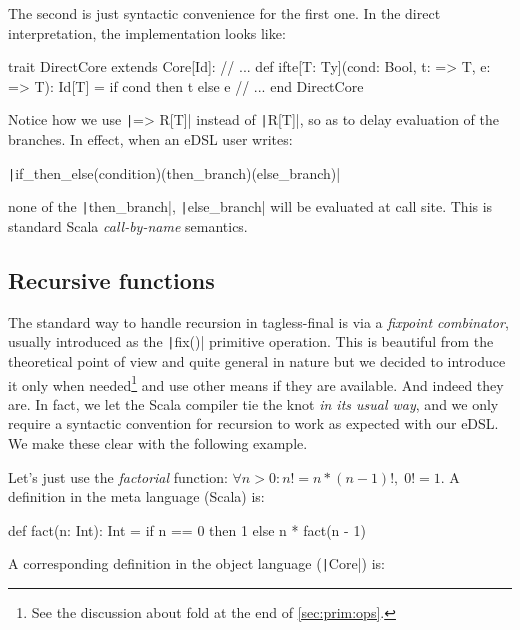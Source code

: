 \documentclass[11pt]{article}
\newcommand{\ScalaI}[1]{\texttt|#1|}
\begin{document}
\noindent The second is just syntactic convenience for the first one. In the 
direct interpretation, the implementation looks like:

\begin{ScalaBlockSimple}
trait DirectCore extends Core[Id]:
  // ...
  def ifte[T: Ty](cond: Bool, t: => T, e: => T): Id[T] =
    if cond then t else e
  // ...
end DirectCore
\end{ScalaBlockSimple}

Notice how we use \ScalaI{=> R[T]} instead of \ScalaI{R[T]}, so as to delay 
evaluation of the branches. In effect, when an eDSL user writes:

\ScalaI{if_then_else(condition)(then_branch)(else_branch)}

\noindent none of the \ScalaI{then_branch}, \ScalaI{else_branch} will be 
evaluated at call site. This is standard Scala \textit{call-by-name} 
semantics.


\subsection{Recursive functions}
\label{sec:rec:fun}
The standard way to handle recursion in tagless-final is via a 
\textit{fixpoint combinator}, usually introduced as the \ScalaI{fix()} 
primitive operation. This is beautiful from the theoretical point of view and 
quite general in nature but we decided to introduce it only when 
needed\footnote{See the discussion about fold at the end of 
\autoref{sec:prim:ops}.} and use other means if they are available. And 
indeed they are. In fact, we let the Scala compiler tie the knot \textit{in 
its usual way}, and we only require a syntactic convention for recursion to 
work as expected with our eDSL. We make these clear with the following 
example.

Let's just use the \textit{factorial} function: $\forall n > 0: n! = n * (n - 
1)!, \; 0! = 1$. A definition in the meta language (Scala) is:

\begin{ScalaBlockSimple}
def fact(n: Int): Int =
  if n == 0 then 1 else n * fact(n - 1)
\end{ScalaBlockSimple}

\noindent A corresponding definition in the object language (\ScalaI{Core}) 
is:
\end{document}

